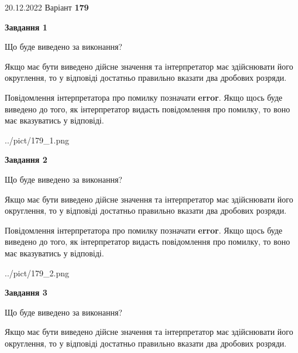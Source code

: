 \documentclass[12pt, ukrainian]{article}
\begin{document}
{20.12.2022 Варіант \No \textbf { 179 }\par}
{
\begin {Large}

{\begin {center}\textbf{Завдання 1}\end {center}}\par
Що буде виведено за виконання? \par

Якщо має бути виведено дійсне значення та інтерпретатор має здійснювати його округлення, 
то у відповіді достатньо правильно вказати два дробових розряди.

Повідомлення інтерпретатора про помилку позначати \textbf{error}.
Якщо щось буде виведено до того, як інтерпретатор видасть повідомлення про помилку, 
то воно має вказуватись у відповіді. \par

\begin{center}
	{../pict/179_1.png}
\end{center}
\newpage

{\begin {center}\textbf{Завдання 2}\end {center}}\par
Що буде виведено за виконання? \par

Якщо має бути виведено дійсне значення та інтерпретатор має здійснювати його округлення, 
то у відповіді достатньо правильно вказати два дробових розряди.

Повідомлення інтерпретатора про помилку позначати \textbf{error}.
Якщо щось буде виведено до того, як інтерпретатор видасть повідомлення про помилку, 
то воно має вказуватись у відповіді. \par

\begin{center}
	{../pict/179_2.png}
\end{center}
\newpage

{\begin {center}\textbf{Завдання 3}\end {center}}\par
Що буде виведено за виконання? \par

Якщо має бути виведено дійсне значення та інтерпретатор має здійснювати його округлення, 
то у відповіді достатньо правильно вказати два дробових розряди.


\end{Large}}
\end{document}
